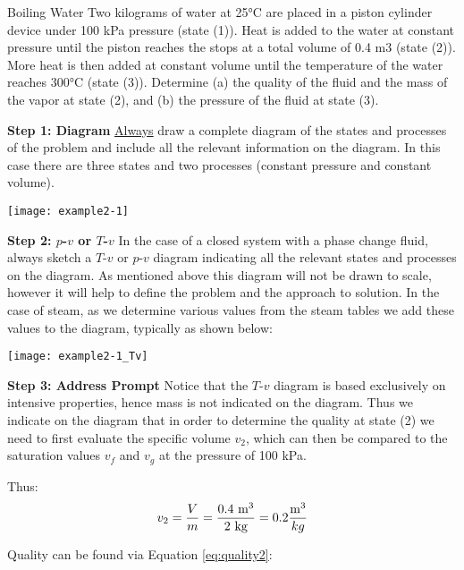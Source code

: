\begin{example}{Boiling Water}
  Two kilograms of water at 25°C are placed in a piston cylinder device under 100 kPa pressure (state (1)). Heat is added to the water at constant pressure until the piston reaches the stops at a total volume of 0.4 m3 (state (2)). More heat is then added at constant volume until the temperature of the water reaches 300°C (state (3)). Determine (a) the quality of the fluid and the mass of the vapor at state (2), and (b) the pressure of the fluid at state (3).


{\bf Step 1: Diagram} \quad  \underline{Always} draw a complete diagram of the states and processes of the problem and include all the relevant information on the diagram. In this case there are three states and two processes (constant pressure and constant volume).

\begin{center}
\texttt{[image: example2-1]}
\end{center}

{\bf Step 2: $p$-$v$ or $T$-$v$} \quad  In the case of a closed system with a phase change fluid, always sketch a $T$-$v$ or $p$-$v$ diagram indicating all the relevant states and processes on the diagram. As mentioned above this diagram will not be drawn to scale, however it will help to define the problem and the approach to solution. In the case of steam, as we determine various values from the steam tables we add these values to the diagram, typically as shown below:

\begin{center}
\texttt{[image: example2-1\_Tv]}
\end{center}


{\bf Step 3: Address Prompt} \quad Notice that the $T$-$v$ diagram is based exclusively on intensive properties, hence mass is not indicated on the diagram. Thus we indicate on the diagram that in order to determine the quality at state (2) we need to first evaluate the specific volume $v_2$, which can then be compared to the saturation values $v_f$ and $v_g$ at the pressure of 100 kPa.

Thus:
\begin{equation*}
  v_2 = \frac{V}{m} = \frac{0.4\ \rm m^3}{\rm 2\ kg} = 0.2 \frac{\rm m^3}{kg}
\end{equation*}

Quality can be found via Equation \ref{eq:quality2}:


\end{example}

